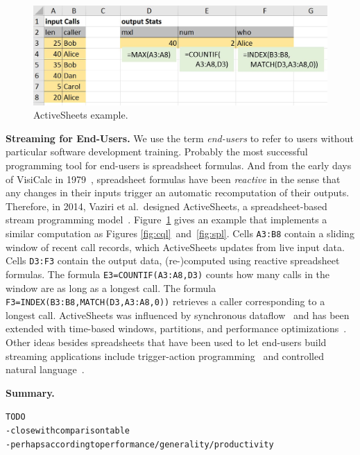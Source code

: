 \begin{figure}[!h]
\centerline{\includegraphics[width=\columnwidth]{CallStats.jpg}}
\vspace*{-4mm}
\caption{\label{fig:activesheets}ActiveSheets example.}
\end{figure}

\textbf{Streaming for End-Users.}
%
We use the term \emph{end-users} to refer to users without particular
software development training. Probably the most successful
programming tool for end-users is spreadsheet formulas. And from the
early days of VisiCalc in 1979~\cite{bricklin_frankston_1979},
spreadsheet formulas have been \emph{reactive} in the sense that any
changes in their inputs trigger an automatic recomputation of their
outputs. Therefore, in 2014, Vaziri et al.\ designed ActiveSheets, a
spreadsheet-based stream programming model~\cite{vaziri_et_al_2014}.
Figure~\ref{fig:activesheets} gives an example that implements a
similar computation as Figures \mbox{\ref{fig:cql} and \ref{fig:spl}}.
Cells \lstinline{A3:B8} contain a sliding window of recent call
records, which ActiveSheets updates from live input data. Cells
\lstinline{D3:F3} contain the output data, \mbox{(re-)}com\-pu\-ted
using reactive spreadsheet formulas. The formula
\mbox{\lstinline{E3=COUNTIF(A3:A8,D3)}} counts how many calls in the
window are as long as a longest call. The formula
\mbox{\lstinline{F3=INDEX(B3:B8,MATCH(D3,A3:A8,0))}} retrieves a
caller corresponding to a longest call. ActiveSheets was influenced by
synchronous dataflow~\cite{lustre_1987} and has been extended with
time-based windows, partitions, and performance
optimizations~\cite{hirzel_et_al_2016}. Other ideas besides
spreadsheets that have been used to let end-users build streaming
applications include trigger-action programming~\cite{ifttt} and
controlled natural language~\cite{arnold_et_al_2016}.

\textbf{Summary.}
\begin{alltt}TODO\scriptsize
- close with comparison table
- perhaps according to performance/generality/productivity
\end{alltt}
